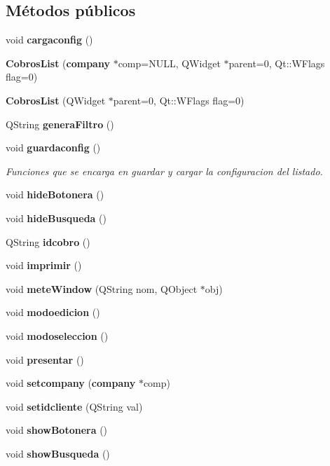 \subsection*{M\'{e}todos p\'{u}blicos}
\begin{CompactItemize}
\item 
void {\bf cargaconfig} ()\label{classCobrosList_a0}

\item 
{\bf Cobros\-List} ({\bf company} $\ast$comp=NULL, QWidget $\ast$parent=0, Qt::WFlags flag=0)\label{classCobrosList_a1}

\item 
{\bf Cobros\-List} (QWidget $\ast$parent=0, Qt::WFlags flag=0)\label{classCobrosList_a2}

\item 
QString {\bf genera\-Filtro} ()\label{classCobrosList_a3}

\item 
void {\bf guardaconfig} ()\label{classCobrosList_a4}

\begin{CompactList}\small\item\em Funciones que se encarga en guardar y cargar la configuracion del listado. \item\end{CompactList}\item 
void {\bf hide\-Botonera} ()\label{classCobrosList_a5}

\item 
void {\bf hide\-Busqueda} ()\label{classCobrosList_a6}

\item 
QString {\bf idcobro} ()\label{classCobrosList_a7}

\item 
void {\bf imprimir} ()\label{classCobrosList_a8}

\item 
void {\bf mete\-Window} (QString nom, QObject $\ast$obj)\label{classCobrosList_a9}

\item 
void {\bf modoedicion} ()\label{classCobrosList_a10}

\item 
void {\bf modoseleccion} ()\label{classCobrosList_a11}

\item 
void {\bf presentar} ()
\item 
void {\bf setcompany} ({\bf company} $\ast$comp)\label{classCobrosList_a13}

\item 
void {\bf setidcliente} (QString val)\label{classCobrosList_a14}

\item 
void {\bf show\-Botonera} ()\label{classCobrosList_a15}

\item 
void {\bf show\-Busqueda} ()\label{classCobrosList_a16}

\end{CompactItemize}


